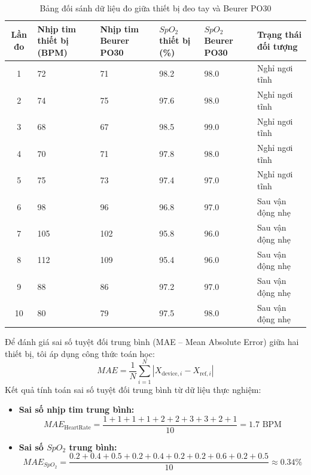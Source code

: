 \begin{table}[H]
    \centering
    \caption{Bảng đối sánh dữ liệu đo giữa thiết bị đeo tay và Beurer PO30}
    \label{tab:comparison_data}
    \fontsize{11pt}{14pt}\selectfont
    \renewcommand{\baselinestretch}{1.15}
    \renewcommand{\arraystretch}{1.15}
    \begin{tabularx}{\textwidth}{|c|X|X|X|X|p{3.5cm}|}
        \hline
        \textbf{Lần đo} & \textbf{Nhịp tim thiết bị (BPM)} & \textbf{Nhịp tim Beurer PO30} & \textbf{$SpO_2$ thiết bị (\%)} & \textbf{$SpO_2$ Beurer PO30} & \textbf{Trạng thái đối tượng} \\ \hline
        1 & 72 & 71 & 98.2 & 98.0 & Nghỉ ngơi tĩnh \\ \hline
        2 & 74 & 75 & 97.6 & 98.0 & Nghỉ ngơi tĩnh \\ \hline
        3 & 68 & 67 & 98.5 & 99.0 & Nghỉ ngơi tĩnh \\ \hline
        4 & 70 & 71 & 97.8 & 98.0 & Nghỉ ngơi tĩnh \\ \hline
        5 & 75 & 73 & 97.4 & 97.0 & Nghỉ ngơi tĩnh \\ \hline
        6 & 98 & 96 & 96.8 & 97.0 & Sau vận động nhẹ \\ \hline
        7 & 105 & 102 & 95.8 & 96.0 & Sau vận động nhẹ \\ \hline
        8 & 112 & 109 & 95.4 & 96.0 & Sau vận động nhẹ \\ \hline
        9 & 88 & 86 & 97.2 & 97.0 & Sau vận động nhẹ \\ \hline
        10 & 80 & 79 & 97.5 & 98.0 & Sau vận động nhẹ \\ \hline
    \end{tabularx}
\end{table}

Để đánh giá sai số tuyệt đối trung bình (MAE -- Mean Absolute Error) giữa hai thiết bị, tôi áp dụng công thức toán học:
\begin{equation}
    MAE = \frac{1}{N} \sum_{i=1}^{N} |X_{\text{device},i} - X_{\text{ref},i}|
\end{equation}
Kết quả tính toán sai số tuyệt đối trung bình từ dữ liệu thực nghiệm:
\begin{itemize}
    \item \textbf{Sai số nhịp tim trung bình:}
    \begin{equation}
        MAE_{\text{HeartRate}} = \frac{1 + 1 + 1 + 1 + 2 + 2 + 3 + 3 + 2 + 1}{10} = 1.7\text{ BPM}
    \end{equation}
    \item \textbf{Sai số $SpO_2$ trung bình:}
    \begin{equation}
        MAE_{SpO_2} = \frac{0.2 + 0.4 + 0.5 + 0.2 + 0.4 + 0.2 + 0.2 + 0.6 + 0.2 + 0.5}{10} \approx 0.34\%
    \end{equation}
\end{itemize}

